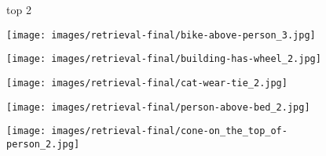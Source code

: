 \documentclass[10pt,twocolumn,letterpaper]{article}
\begin{document}
\begin{figure*}[t]
\begin{minipage}[b]{0.005\textwidth}
    	\centering
    	\begin{turn}{90}
    	top 2
    	\end{turn}
    	\vspace{3ex}
    \end{minipage}
    \hspace{0.01\textwidth}
    \begin{minipage}[t]{0.18\textwidth}
    	\centering
       	\texttt{[image: images/retrieval-final/bike-above-person\_3.jpg]}\\
       	\vspace{0.2ex}
    \end{minipage}
    \hspace{0.005\textwidth}
\begin{minipage}[t]{0.18\textwidth}
       \centering
       \texttt{[image: images/retrieval-final/building-has-wheel\_2.jpg]}\\
       \vspace{0.2ex}
    \end{minipage}
    \hspace{0.005\textwidth}
\begin{minipage}[t]{0.18\textwidth}
    	\centering
       	\texttt{[image: images/retrieval-final/cat-wear-tie\_2.jpg]}\\
       	\vspace{0.2ex}
    \end{minipage}
    \hspace{0.005\textwidth}
\begin{minipage}[t]{0.18\textwidth}
    	\centering
       	\texttt{[image: images/retrieval-final/person-above-bed\_2.jpg]}\\
       	\vspace{0.2ex}
    \end{minipage}
    \hspace{0.005\textwidth}  
\begin{minipage}[t]{0.18\textwidth}
    	\centering
       	\texttt{[image: images/retrieval-final/cone-on\_the\_top\_of-person\_2.jpg]}\\
      	\vspace{0.2ex}
    \end{minipage} 
    

\end{figure*}
\end{document}
